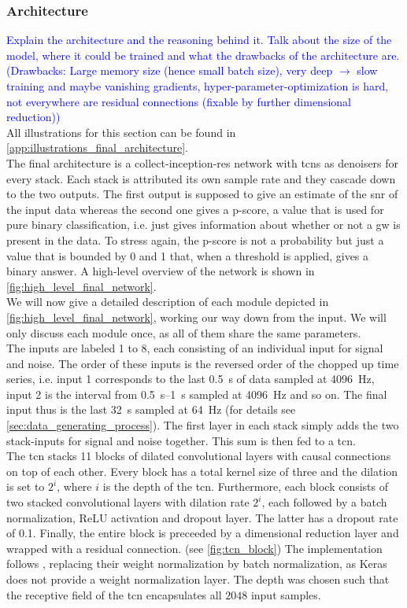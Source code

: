 \subsubsection{Architecture}\label{sec:final_architecture}
\textcolor{blue}{Explain the architecture and the reasoning behind it. Talk about the size of the model, where it could be trained and what the drawbacks of the architecture are. (Drawbacks: Large memory size (hence small batch size), very deep $\to$ slow training and maybe vanishing gradients, hyper-parameter-optimization is hard, not everywhere are residual connections (fixable by further dimensional reduction))}\\
All illustrations for this section can be found in \autoref{app:illustrations_final_architecture}.\\
The final architecture is a collect-inception-res network with \gls{tcn}s as denoisers for every stack. Each stack is attributed its own sample rate and they cascade down to the two outputs. The first output is supposed to give an estimate of the \gls{snr} of the input data whereas the second one gives a p-score, a value that is used for pure binary classification, i.e. just gives information about whether or not a \gls{gw} is present in the data. To stress again, the p-score is not a probability but just a value that is bounded by 0 and 1 that, when a threshold is applied, gives a binary answer. A high-level overview of the network is shown in \autoref{fig:high_level_final_network}.\\
We will now give a detailed description of each module depicted in \autoref{fig:high_level_final_network}, working our way down from the input. We will only discuss each module once, as all of them share the same parameters.\\
The inputs are labeled 1 to 8, each consisting of an individual input for signal and noise. The order of these inputs is the reversed order of the chopped up time series, i.e. input 1 corresponds to the last \SI{0.5}{\s} of data sampled at \SI{4096}{\hertz}, input 2 is the interval from \SIrange{0.5}{1}{\s} sampled at \SI{4096}{\hertz} and so on. The final input thus is the last \SI{32}{\s} sampled at \SI{64}{\hertz} (for details see \autoref{sec:data_generating_process}). The first layer in each stack simply adds the two stack-inputs for signal and noise together. This sum is then fed to a \gls{tcn}.\\
The \gls{tcn} stacks 11 blocks of dilated convolutional layers with causal connections on top of each other. Every block has a total kernel size of three and the dilation is set to $2^i$, where $i$ is the depth of the \gls{tcn}. Furthermore, each block consists of two stacked convolutional layers with dilation rate $2^i$, each followed by a  batch normalization, ReLU activation and dropout layer. The latter has a dropout rate of 0.1. Finally, the entire block is preceeded by a dimensional reduction layer and wrapped with a residual connection. (see \autoref{fig:tcn_block}) The implementation follows \cite{tcn_paper}, replacing their weight normalization by batch normalization, as Keras does not provide a weight normalization layer. The depth was chosen such that the receptive field of the \gls{tcn} encapsulates all $2048$ input samples.\\
